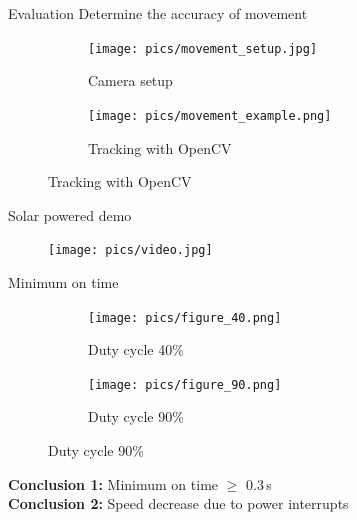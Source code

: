 \documentclass{beamer}
\begin{document}
\begin{frame}{Evaluation}
	Determine the accuracy of movement
	\pause
	\vspace{1em}
	\begin{figure}
		\centering
		\begin{subfigure}[b]{0.45\textwidth}
			\texttt{[image: pics/movement\_setup.jpg]}
			\caption*{Camera setup}
		\end{subfigure}
		\quad
		\begin{subfigure}[b]{0.45\textwidth}
			\texttt{[image: pics/movement\_example.png]}
			\caption*{Tracking with OpenCV}
		\end{subfigure}
	\end{figure}
\end{frame}

\begin{frame}{Solar powered demo}
\begin{figure}
	\centering
	\texttt{[image: pics/video.jpg]}
\end{figure}
\end{frame}

\begin{frame}{Minimum on time}
	\vspace{0.5em}
	\vspace{-0.5em}
	\begin{figure}
		\centering
		\begin{subfigure}[b]{0.28\textwidth}
			\texttt{[image: pics/figure\_40.png]}
			\caption*{Duty cycle 40\%}
		\end{subfigure}
		\hspace{2em}
		\begin{subfigure}[b]{0.28\textwidth}
			\texttt{[image: pics/figure\_90.png]}
			\caption*{Duty cycle 90\%}
		\end{subfigure}
	\end{figure}
	\pause
	\vspace{0.5em}
	\textbf{Conclusion 1:} Minimum on time $\geq$ 0.3\,s \\
	\textbf{Conclusion 2:} Speed decrease due to power interrupts \\
\end{frame}
\end{document}
